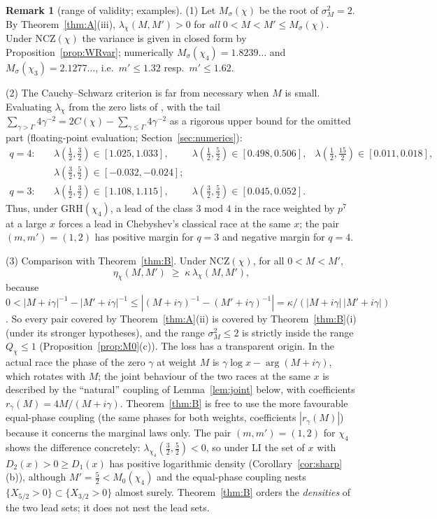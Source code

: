 \documentclass[11pt]{amsart}
\theoremstyle{definition}
\newtheorem{remark}[theorem]{Remark}
\numberwithin{equation}{section}
\begin{document}
\begin{remark}[range of validity; examples]\label{rem:Arange}
(1) Let $M_\sigma(\chi)$ be the root of $\sigma_M^2=2$. By
Theorem~\ref{thm:A}(iii), $\lambda_\chi(M,M')>0$ for \emph{all}
$0<M<M'\le M_\sigma(\chi)$. Under NCZ$(\chi)$ the variance is given in
closed form by Proposition~\ref{prop:WRvar}; numerically
$M_\sigma(\chi_4)=1.8239\ldots$ and $M_\sigma(\chi_3)=2.1277\ldots$,
i.e.\ $m'\le1.32$ resp.\ $m'\le1.62$.

(2) The Cauchy--Schwarz criterion is far from necessary when $M$ is
small. Evaluating $\lambda_\chi$ from the zero lists of \cite{WR}, with
the tail $\sum_{\gamma>\Gamma}4\gamma^{-2}=2C(\chi)-\sum_{\gamma\le\Gamma}
4\gamma^{-2}$ as a rigorous upper bound for the omitted part
(floating-point evaluation; Section~\ref{sec:numerics}):
\[
\begin{array}{llll}
q=4:\quad&\lambda(\tfrac12,\tfrac32)\in[1.025,1.033],
&\lambda(\tfrac12,\tfrac52)\in[0.498,0.506],
&\lambda(\tfrac12,\tfrac{15}2)\in[0.011,0.018],\\[2pt]
&\lambda(\tfrac32,\tfrac52)\in[-0.032,-0.024];&&\\[2pt]
q=3:\quad&\lambda(\tfrac12,\tfrac32)\in[1.108,1.115],
&\lambda(\tfrac32,\tfrac52)\in[0.045,0.052].&
\end{array}
\]
Thus, under GRH$(\chi_4)$, a lead of the class $3$ mod $4$ in the race
weighted by $p^{7}$ at a large $x$ forces a lead in Chebyshev's
classical race at the same $x$; the pair $(m,m')=(1,2)$ has positive
margin for $q=3$ and negative margin for $q=4$.

(3) Comparison with Theorem~\ref{thm:B}. Under NCZ$(\chi)$, for all
$0<M<M'$,
\begin{equation}\label{eq:etalambda}
\eta_\chi(M,M')\;\ge\;\kappa\,\lambda_\chi(M,M') ,
\end{equation}
because $0<|M+i\gamma|^{-1}-|M'+i\gamma|^{-1}
\le|(M+i\gamma)^{-1}-(M'+i\gamma)^{-1}|
=\kappa/(|M+i\gamma|\,|M'+i\gamma|)$. So every pair covered by
Theorem~\ref{thm:A}(ii) is covered by Theorem~\ref{thm:B}(i) (under
its stronger hypotheses), and the range $\sigma_M^2\le2$ is strictly
inside the range $Q_\chi\le1$ (Proposition~\ref{prop:M0}(c)). The
loss has a transparent origin. In the actual race the phase of the
zero $\gamma$ at weight $M$ is $\gamma\log x-\arg(M+i\gamma)$, which
rotates with $M$; the joint behaviour of the two races at the same
$x$ is described by the ``natural'' coupling of
Lemma~\ref{lem:joint} below, with coefficients
$r_\gamma(M)=4M/(M+i\gamma)$. Theorem~\ref{thm:B} is free to use the
more favourable equal-phase coupling (the same phases for both
weights, coefficients $|r_\gamma(M)|$) because it concerns the
marginal laws only. The pair $(m,m')=(1,2)$ for $\chi_4$ shows the
difference concretely: $\lambda_{\chi_4}(\tfrac32,\tfrac52)<0$, so
under LI the set of $x$ with $D_2(x)>0\ge D_1(x)$ has positive
logarithmic density (Corollary~\ref{cor:sharp}(b)), although
$M'=\tfrac52<M_0(\chi_4)$ and the equal-phase coupling nests
$\{X_{5/2}>0\}\subset\{X_{3/2}>0\}$ almost surely. Theorem~\ref{thm:B}
orders the \emph{densities} of the two lead sets; it does not nest
the lead sets.
\end{remark}
\end{document}
